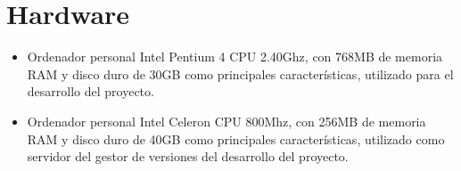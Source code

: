 \section{Hardware}

\begin{itemize}
   \item Ordenador personal Intel Pentium 4 CPU 2.40Ghz, con 768MB de memoria
   RAM y disco duro de 30GB como principales características, utilizado para el
   desarrollo del proyecto.
   \item Ordenador personal Intel Celeron CPU 800Mhz, con 256MB de memoria RAM y
   disco duro de 40GB como principales características, utilizado como servidor
   del gestor de versiones del desarrollo del proyecto.
\end{itemize}